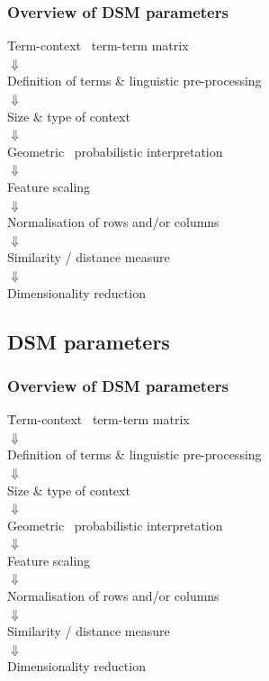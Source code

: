 \begin{frame}
  \frametitle{Overview of DSM parameters}

  \ungap[1]
  \begin{center}
    Term-context \vs\ term-term matrix\\
    \pause $\Downarrow$\\
    Definition of terms \& linguistic pre-processing\\
    \pause $\Downarrow$\\
    Size \& type of context\\
    \pause $\Downarrow$\\
    Geometric \vs\ probabilistic interpretation\\
    \pause $\Downarrow$\\
    Feature scaling\\
    \pause $\Downarrow$\\
    Normalisation of rows and/or columns\\
    \pause $\Downarrow$\\
    Similarity / distance measure\\
    \pause $\Downarrow$\\
    Dimensionality reduction
  \end{center}
\end{frame}

\subsection{DSM parameters}

\begin{frame}
  \frametitle{Overview of DSM parameters}

  \ungap[1]
  \begin{center}
    \h{Term-context \vs\ term-term matrix}\\
    $\Downarrow$\\
    Definition of terms \& linguistic pre-processing\\
    $\Downarrow$\\
    Size \& type of context\\
    $\Downarrow$\\
    Geometric \vs\ probabilistic interpretation\\
    $\Downarrow$\\
    Feature scaling\\
    $\Downarrow$\\
    Normalisation of rows and/or columns\\
    $\Downarrow$\\
    Similarity / distance measure\\
    $\Downarrow$\\
    Dimensionality reduction
  \end{center}
\end{frame}

